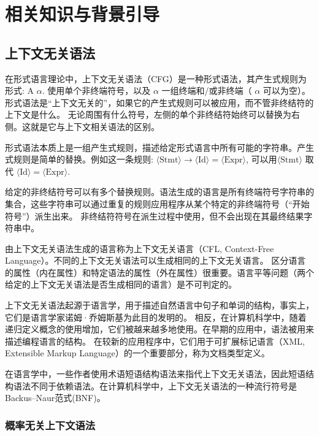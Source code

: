 
\chapter{相关知识与背景引导}


\section{上下文无关语法}

在形式语言理论中，上下文无关语法（CFG）是一种形式语法，其产生式规则为形式: A \rightarrow $\alpha$. 
使用单个非终端符号，以及 $\alpha$ 一组终端和/或非终端（ $\alpha$ 可以为空）。
形式语法是“上下文无关的”，如果它的产生式规则可以被应用，而不管非终结符的上下文是什么。
无论周围有什么符号，左侧的单个非终结符始终可以替换为右侧。这就是它与上下文相关语法的区别。

形式语法本质上是一组产生式规则，描述给定形式语言中所有可能的字符串。产生式规则是简单的替换。例如这一条规则: $\displaystyle \langle {\text{Stmt}}\rangle \to \langle {\text{Id}}\rangle =\langle {\text{Expr}}\rangle$, 
可以用$\displaystyle \langle {\text{Stmt}}\rangle$ 取代 $\langle {\text{Id}}\rangle =\langle {\text{Expr}}\rangle$.

给定的非终结符号可以有多个替换规则。语法生成的语言是所有终端符号字符串的集合，这些字符串可以通过重复的规则应用程序从某个特定的非终端符号（“开始符号”）派生出来。
非终结符符号在派生过程中使用，但不会出现在其最终结果字符串中。

由上下文无关语法生成的语言称为上下文无关语言（CFL, Context-Free Language）。不同的上下文无关语法可以生成相同的上下文无关语言。
区分语言的属性（内在属性）和特定语法的属性（外在属性）很重要。语言平等问题（两个给定的上下文无关语法是否生成相同的语言）是不可判定的。

上下文无关语法起源于语言学，用于描述自然语言中句子和单词的结构，事实上，它们是语言学家诺姆·乔姆斯基为此目的发明的。
相反，在计算机科学中，随着递归定义概念的使用增加，它们被越来越多地使用。在早期的应用中，语法被用来描述编程语言的结构。
在较新的应用程序中，它们用于可扩展标记语言（XML,  Extensible Markup Language）的一个重要部分，称为文档类型定义。

在语言学中，一些作者使用术语短语结构语法来指代上下文无关语法，因此短语结构语法不同于依赖语法。在计算机科学中，上下文无关语法的一种流行符号是Backus–Naur范式(BNF)。

\subsection{概率无关上下文语法}

